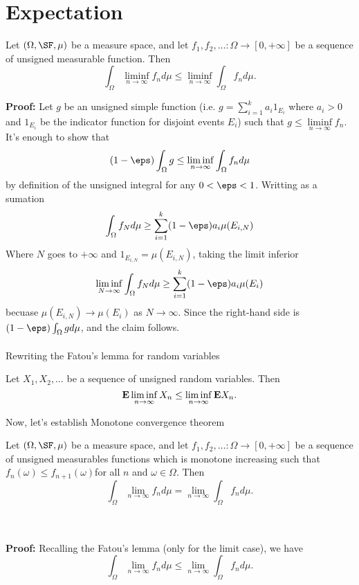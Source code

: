 \documentclass[11pt]{scrartcl}
\begin{document}
\section{Expectation}
\begin{lemma}
  Let $(\Omega, \SF, \mu)$ be a measure space, and let $f_{1}, f_{2}, \dots: \Omega \longrightarrow [0, +\infty]$ be a sequence of unsigned measurable function. Then
  $$
  \int_{\Omega} \liminf_{n \to \infty} f_{n} d\mu \leq \liminf_{n \to \infty} \int_{\Omega} f_{n} d\mu.
  $$ 
\end{lemma} 
\textbf{Proof:}
Let $g$ be an unsigned simple function (i.e. $g = \sum_{i=1}^{k} a_{i}1_{E_{i}}$ where $a_{i} > 0$ and $1_{E_{i}}$ be the indicator function for disjoint events $E_{i}$) such that $g \leq \liminf\limits_{n \to \infty} f_{n}$. It's enough to show that 
$$
(1 - \eps) \int_{\Omega} g \leq \liminf_{n \to \infty} \int_{\Omega} f_{n} d\mu
$$
by definition of the unsigned integral for any $0 < \eps < 1$. Writting as a sumation
$$
\int_{\Omega} f_{N} d\mu \geq \sum_{i=1}^{k} (1 - \eps)a_{i}\mu(E_{i, N})
$$
Where $N$ goes to $+\infty$ and $1_{E_{i, N}} = \mu(E_{i, N})$, taking the limit inferior
$$
\liminf_{N \to \infty} \int_{\Omega} f_{N} d\mu \geq \sum_{i=1}^{k} (1 - \eps)a_{i}\mu(E_{i})
$$
becuase $\mu(E_{i, N}) \to \mu(E_{i})$ as $N \to \infty$. Since the right-hand side is $(1 - \eps) \int_{\Omega} g d\mu$, and the claim follows. \\ \\
Rewriting the Fatou's lemma for random variables

\begin{lemma}
  Let $X_{1}, X_{2}, \dots$ be a sequence of unsigned random variables. Then
  $$
  {\bf E} \liminf_{n \to \infty} X_{n} \leq \liminf_{n \to \infty} {\bf E}X_{n}.
  $$
\end{lemma}
Now, let's establish Monotone convergence theorem
\begin{theorem}
  Let $(\Omega, \SF, \mu)$ be a measure space, and let $f_{1}, f_{2}, \dots: \Omega \longrightarrow [0, +\infty]$ be a sequence of unsigned measurables functions which is monotone increasing such that $f_{n}(\omega) \leq f_{n+1}(\omega)$for all $n$ and $\omega \in \Omega$. Then
  $$
  \int_{\Omega} \lim_{n \to \infty} f_{n} d\mu = \lim_{n \to \infty} \int_{\Omega} f_{n} d\mu.
  $$
\end{theorem} \\ \\ 
\textbf{Proof:}
Recalling the Fatou's lemma (only for the limit case), we have 
  $$
  \int_{\Omega} \lim_{n \to \infty} f_{n} d\mu \leq \lim_{n \to \infty} \int_{\Omega} f_{n} d\mu.
  $$ 
\end{document}
